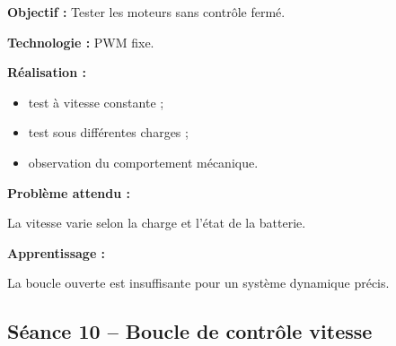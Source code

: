 \documentclass[11pt,a4paper]{article}
\begin{document}
	\begin{sessionbox}
		
		\textbf{Objectif :} Tester les moteurs sans contrôle fermé.
		
		\vspace{0.3cm}
		
		\textbf{Technologie :} PWM fixe.
		
		\vspace{0.3cm}
		
		\textbf{Réalisation :}
		
		\begin{itemize}
			\item test à vitesse constante ;
			\item test sous différentes charges ;
			\item observation du comportement mécanique.
		\end{itemize}
		
		\vspace{0.3cm}
		
		\textbf{Problème attendu :}
		
		La vitesse varie selon la charge et l'état de la batterie.
		
		\vspace{0.3cm}
		
		\textbf{Apprentissage :}
		
		La boucle ouverte est insuffisante pour un système dynamique précis.
		
	\end{sessionbox}
	
	\subsection*{Séance 10 -- Boucle de contrôle vitesse}
	
\end{document}
